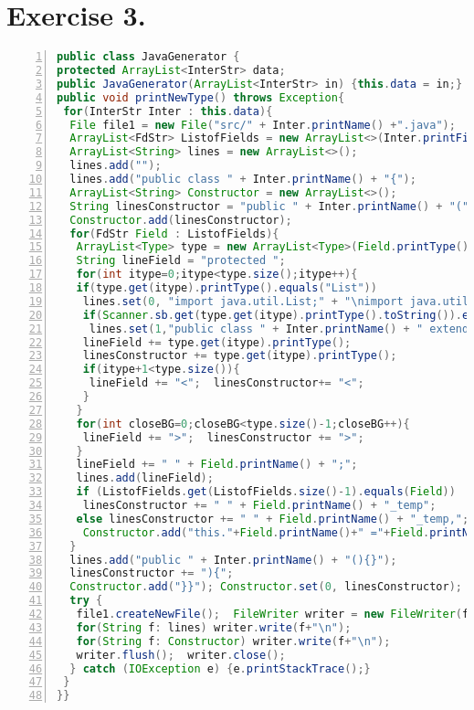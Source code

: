 \documentclass[10pt]{report}
\begin{document}
\section{Exercise 3.}
\label{JavaGenerator}
\begin{lstlisting}[numbers=left,language=Java,frame=single,breaklines=true,label=Code:ZeroIn, caption=Java Generator.]
public class JavaGenerator {
protected ArrayList<InterStr> data;
public JavaGenerator(ArrayList<InterStr> in) {this.data = in;}
public void printNewType() throws Exception{
 for(InterStr Inter : this.data){
  File file1 = new File("src/" + Inter.printName() +".java");
  ArrayList<FdStr> ListofFields = new ArrayList<>(Inter.printField());
  ArrayList<String> lines = new ArrayList<>();
  lines.add("");
  lines.add("public class " + Inter.printName() + "{");
  ArrayList<String> Constructor = new ArrayList<>();
  String linesConstructor = "public " + Inter.printName() + "("; 
  Constructor.add(linesConstructor);
  for(FdStr Field : ListofFields){
   ArrayList<Type> type = new ArrayList<Type>(Field.printType());
   String lineField = "protected ";
   for(int itype=0;itype<type.size();itype++){
   if(type.get(itype).printType().equals("List"))
    lines.set(0, "import java.util.List;" + "\nimport java.util.ArrayList;");
    if(Scanner.sb.get(type.get(itype).printType().toString()).equals(Scanner.TKT.NEWTYPE) && type.size()==1)
     lines.set(1,"public class " + Inter.printName() + " extends " + type.get(itype).printType().toString() +"{");
    lineField += type.get(itype).printType();
    linesConstructor += type.get(itype).printType();
    if(itype+1<type.size()){
     lineField += "<";  linesConstructor+= "<";
    }
   }
   for(int closeBG=0;closeBG<type.size()-1;closeBG++){
    lineField += ">";  linesConstructor += ">";
   }
   lineField += " " + Field.printName() + ";";
   lines.add(lineField);
   if (ListofFields.get(ListofFields.size()-1).equals(Field))
    linesConstructor += " " + Field.printName() + "_temp";
   else	linesConstructor += " " + Field.printName() + "_temp,";
    Constructor.add("this."+Field.printName()+" ="+Field.printName()+"_temp;");
  }
  lines.add("public " + Inter.printName() + "(){}");
  linesConstructor += "){";
  Constructor.add("}}"); Constructor.set(0, linesConstructor);
  try {
   file1.createNewFile();  FileWriter writer = new FileWriter(file1); 
   for(String f: lines) writer.write(f+"\n");
   for(String f: Constructor) writer.write(f+"\n");
   writer.flush();  writer.close();
  } catch (IOException e) {e.printStackTrace();}
 }
}}
\end{lstlisting}
\end{document}
